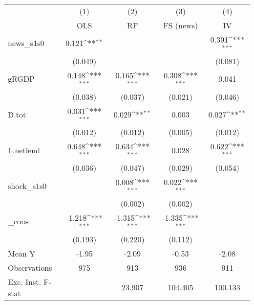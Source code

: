 {
\def\sym#1{\ifmmode^{#1}\else\(^{#1}\)\fi}
\begin{tabular}{l*{4}{c}}
\toprule
            &\multicolumn{1}{c}{(1)}&\multicolumn{1}{c}{(2)}&\multicolumn{1}{c}{(3)}&\multicolumn{1}{c}{(4)}\\
            &\multicolumn{1}{c}{OLS}&\multicolumn{1}{c}{RF}&\multicolumn{1}{c}{FS (news)}&\multicolumn{1}{c}{IV}\\
\midrule
news\_s1s0   &       0.121\sym{**} &                     &                     &       0.391\sym{***}\\
            &     (0.049)         &                     &                     &     (0.081)         \\
\addlinespace
gRGDP       &       0.148\sym{***}&       0.165\sym{***}&       0.308\sym{***}&       0.041         \\
            &     (0.038)         &     (0.037)         &     (0.021)         &     (0.046)         \\
\addlinespace
D.tot       &       0.031\sym{***}&       0.029\sym{**} &       0.003         &       0.027\sym{**} \\
            &     (0.012)         &     (0.012)         &     (0.005)         &     (0.012)         \\
\addlinespace
L.netlend   &       0.648\sym{***}&       0.634\sym{***}&       0.028         &       0.622\sym{***}\\
            &     (0.036)         &     (0.047)         &     (0.029)         &     (0.054)         \\
\addlinespace
shock\_s1s0  &                     &       0.008\sym{***}&       0.022\sym{***}&                     \\
            &                     &     (0.002)         &     (0.002)         &                     \\
\addlinespace
\_cons      &      -1.218\sym{***}&      -1.315\sym{***}&      -1.335\sym{***}&                     \\
            &     (0.193)         &     (0.220)         &     (0.112)         &                     \\
\midrule
Mean Y      &       -1.95         &       -2.09         &       -0.53         &       -2.08         \\
Observations&         975         &         913         &         936         &         911         \\
Exc. Inst. F-stat&                     &      23.907         &     104.405         &     100.133         \\
\bottomrule
\end{tabular}
}
